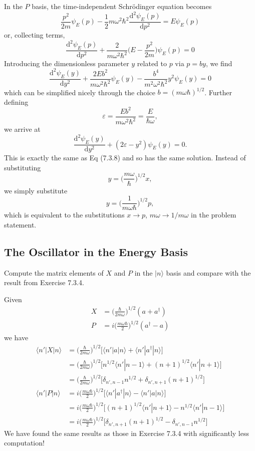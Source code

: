 \documentclass[../principles-of-quantum-mechanics.tex]{subfiles}
\begin{document}
\begin{questions}
		\begin{solution}
			In the $P$ basis, the time-independent Schr\"odinger equation becomes
			$$\frac{p^2}{2m}\psi_E(p) - \frac{1}{2}m\omega^2\hbar^2\frac{\mathrm{d}^2\psi_E(p)}{\mathrm{d}p^2} = E\psi_E(p)$$
			or, collecting terms,
			$$\frac{\mathrm{d}^2\psi_E(p)}{\mathrm{d}p^2} + \frac{2}{m\omega^2\hbar^2}\Big(E - \frac{p^2}{2m}\Big)\psi_E(p) = 0$$
			Introducing the dimensionless parameter $y$ related to $p$ via $p = by$, we find
			$$\frac{\mathrm{d}^2\psi_E(y)}{\mathrm{d}y^2} + \frac{2Eb^2}{m\omega^2\hbar^2}\psi_E(y) - \frac{b^4}{m^2\omega^2\hbar^2}y^2\psi_E(y) = 0$$
			which can be simplified nicely through the choice $b = (m\omega\hbar)^{1/2}$. Further defining
			$$\varepsilon = \frac{Eb^2}{m\omega^2\hbar^2} = \frac{E}{\hbar\omega},$$
			we arrive at
			$$\frac{\mathrm{d}^2\psi_E(y)}{\mathrm{d}y^2} + (2\varepsilon - y^2)\psi_E(y) = 0.$$
			This is exactly the same as Eq (7.3.8) and so has the same solution. Instead of substituting
			$$y = \Big(\frac{m\omega}{\hbar}\Big)^{1/2}x,$$
			we simply substitute
			$$y = \Big(\frac{1}{m\omega\hbar}\Big)^{1/2}p,$$
			which is equivalent to the substitutions $x \to p$, $m\omega \to 1/m\omega$ in the problem statement.
		\end{solution}
	
		\setcounter{subsection}{3}
		\setcounter{question}{0}
		\subsection{The Oscillator in the Energy Basis}
		\question Compute the matrix elements of $X$ and $P$ in the $|n\rangle$ basis and compare with the result from Exercise 7.3.4.
		\begin{solution}
			Given
			\begin{align*}
				X &= \Big(\frac{\hbar}{2m\omega}\Big)^{1/2}(a + a^\dagger) \\
				P &= i\Big(\frac{m\omega\hbar}{2}\Big)^{1/2}(a^\dagger - a)
			\end{align*}
			we have
			\begin{align*}
				\langle n'|X|n\rangle &= \Big(\frac{\hbar}{2m\omega}\Big)^{1/2}\Big[\langle n'|a|n\rangle + \langle n'|a^\dagger|n\rangle\Big] \\
				&= \Big(\frac{\hbar}{2m\omega}\Big)^{1/2}\Big[n^{1/2}\langle n'|n - 1\rangle + (n+1)^{1/2}\langle n'|n+1\rangle\Big] \\
				&= \Big(\frac{\hbar}{2m\omega}\Big)^{1/2}\Big[\delta_{n', n-1}n^{1/2} + \delta_{n', n+1}(n+1)^{1/2}\Big] \\
				\langle n'|P|n\rangle &= i\Big(\frac{m\omega\hbar}{2}\Big)^{1/2}\Big[\langle n'|a^\dagger|n\rangle - \langle n'|a|n\rangle\Big] \\
				&= i\Big(\frac{m\omega\hbar}{2}\Big)^{1/2}\Big[(n+1)^{1/2}\langle n'|n+1\rangle - n^{1/2}\langle n'|n - 1\rangle\Big] \\
				&= i\Big(\frac{m\omega\hbar}{2}\Big)^{1/2}\Big[\delta_{n', n+1}(n+1)^{1/2}- \delta_{n', n-1}n^{1/2}\Big]
			\end{align*}
			We have found the same results as those in Exercise 7.3.4 with significantly less computation!
		\end{solution}
		

\end{questions}
\end{document}
